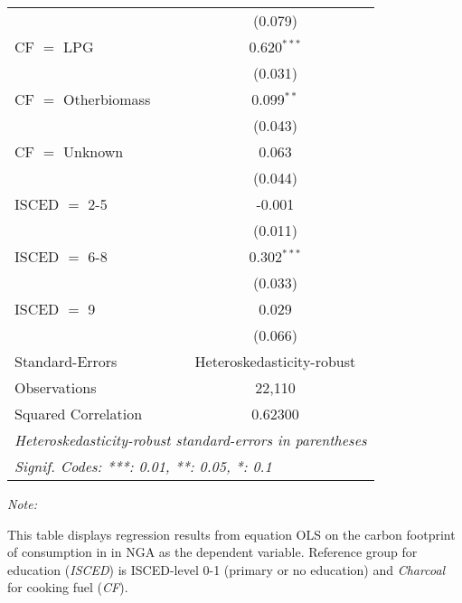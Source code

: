 \begin{table}[htbp!]
\begin{adjustbox}{width = 1\textwidth, max height = 0.95\textheight, center}
\begin{threeparttable}[b]
\begin{tabular}{lc}
                                & (0.079)\\   
            CF $=$ LPG          & 0.620$^{***}$\\   
                                & (0.031)\\   
            CF $=$ Otherbiomass & 0.099$^{**}$\\   
                                & (0.043)\\   
            CF $=$ Unknown      & 0.063\\   
                                & (0.044)\\   
            ISCED $=$ 2-5       & -0.001\\   
                                & (0.011)\\   
            ISCED $=$ 6-8       & 0.302$^{***}$\\   
                                & (0.033)\\   
            ISCED $=$ 9         & 0.029\\   
                                & (0.066)\\   
            \midrule 
            Standard-Errors     & Heteroskedasticity-robust \\   
            Observations        & 22,110\\  
            Squared Correlation & 0.62300\\  
            \midrule \midrule
            \multicolumn{2}{l}{\emph{Heteroskedasticity-robust standard-errors in parentheses}}\\
            \multicolumn{2}{l}{\emph{Signif. Codes: ***: 0.01, **: 0.05, *: 0.1}}\\
         \end{tabular}
         
         \begin{tablenotes}\item \medskip \textit{Note:}
            \item This table displays regression results from equation OLS on the carbon footprint of consumption in  in NGA as the dependent variable.  Reference group for education (\textit{ISCED}) is ISCED-level 0-1 (primary or no education) and \textit{Charcoal} for cooking fuel (\textit{CF}).
         \end{tablenotes}
      \end{threeparttable}
   \end{adjustbox}
\end{table}


